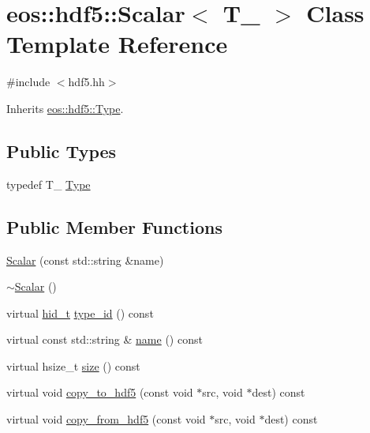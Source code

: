 \hypertarget{classeos_1_1hdf5_1_1Scalar}{
\section{eos::hdf5::Scalar$<$ T\_\- $>$ Class Template Reference}
\label{classeos_1_1hdf5_1_1Scalar}
}


{\ttfamily \#include $<$hdf5.hh$>$}

Inherits \hyperlink{structeos_1_1hdf5_1_1Type}{eos::hdf5::Type}.\subsection*{Public Types}
\begin{DoxyCompactItemize}
\item 
typedef T\_\- \hyperlink{classeos_1_1hdf5_1_1Scalar_a614de8b7185b626dad906cf347b86f92}{Type}
\end{DoxyCompactItemize}
\subsection*{Public Member Functions}
\begin{DoxyCompactItemize}
\item 
\hyperlink{classeos_1_1hdf5_1_1Scalar_ab242719c82cdf865766b1e97d8c9666a}{Scalar} (const std::string \&name)
\item 
\hyperlink{classeos_1_1hdf5_1_1Scalar_a7bc85bf7ef7d9488df0953597bf3254a}{$\sim$Scalar} ()
\item 
virtual \hyperlink{namespaceeos_1_1hdf5_a5bd5e209f1bf36cdc5551465dacf2e74}{hid\_\-t} \hyperlink{classeos_1_1hdf5_1_1Scalar_a5d54b43030237b9bc1c7076184ff968d}{type\_\-id} () const 
\item 
virtual const std::string \& \hyperlink{classeos_1_1hdf5_1_1Scalar_af914b3bd28aa664d17cc6223659c7b45}{name} () const 
\item 
virtual hsize\_\-t \hyperlink{classeos_1_1hdf5_1_1Scalar_a88e62fcc7557957b737a45a9f6ac7952}{size} () const 
\item 
virtual void \hyperlink{classeos_1_1hdf5_1_1Scalar_a4aeec2eb655199bd6ad02464eeb44648}{copy\_\-to\_\-hdf5} (const void $\ast$src, void $\ast$dest) const 
\item 
virtual void \hyperlink{classeos_1_1hdf5_1_1Scalar_a840b94c45ff51454eb2baae727165a71}{copy\_\-from\_\-hdf5} (const void $\ast$src, void $\ast$dest) const 
\end{DoxyCompactItemize}


